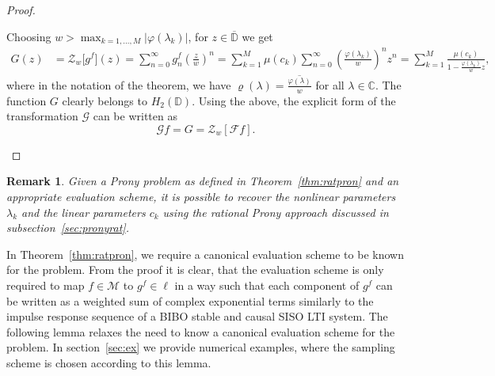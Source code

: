 \documentclass{arxiv}
\newcommand{\cM}{\mathcal{M}}
\newtheorem{remarks}{Remark}[section]
\begin{document}
\begin{proof}
\begin{enumerate}[label = \alph*)]
Choosing $w > \max_{k=1,\ldots,M} |\varphi(\lambda_k)|$, for $z \in \overline{\mathbb{D}}$ we get
\begin{align*}
    \label{eq:h2form}
         G(z) &= \mathcal{Z}_{w} \big[g^f\big] (z) = \sum_{n=0}^{\infty} g^f_n \left( \frac{z}{w} \right)^n = \sum_{k=1}^{M} \mu(c_k) \sum_{n=0}^{\infty} \left( \frac{\varphi(\lambda_k)}{w} \right)^n z^n =\sum_{k=1}^{M} \frac{\mu(c_k)}{1 - {\frac{\varphi(\lambda_k)}{w}}z},
\end{align*}
where in the notation of the theorem, we have $\varrho(\lambda) = \overline{\frac{\varphi(\lambda)}{w}}$ for all $\lambda \in \mathbb{C}$.
The function $G$ clearly belongs to $H_2(\mathbb{D})$. Using the above, the explicit form of the transformation $\mathcal{G}$ can be written as
\begin{equation*}
 \mathcal{G}f = G = \mathcal{Z}_w[\mathcal{F}f].
\end{equation*}
\end{enumerate}

\end{proof}

\begin{remarks}
Given a Prony problem as defined in Theorem~\ref{thm:ratpron} and an appropriate evaluation scheme, it is possible to recover the nonlinear parameters $\lambda_k$ and the linear parameters $c_k$ using the rational Prony approach discussed in subsection~\ref{sec:pronyrat}. 
\end{remarks}

In Theorem~\ref{thm:ratpron}, we require a canonical evaluation scheme to be known for the problem. From the proof it is clear, that the evaluation scheme is only required to map $f \in \cM$ to $g^f \in \ell$ in a way such that each component of $g^f$ can be written as a weighted sum of complex exponential terms similarly to the impulse response sequence of a BIBO stable and causal SISO LTI system. The following lemma relaxes the need to know a canonical evaluation scheme for the problem. In section~\ref{sec:ex} we provide numerical examples, where the sampling scheme is chosen according to this lemma.
\end{document}
